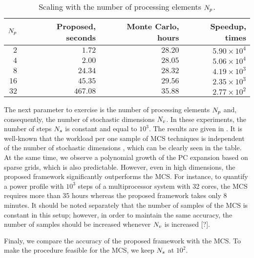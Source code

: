 \begin{table}
  \centering
  \caption{Scaling with the number of processing elements ${N_p}$.}
  \vspace{-10pt}
  \begin{tabular}{|r|r|r|r|}
    \hline
    ${N_p}$ & Proposed, seconds & Monte Carlo, hours & Speedup, times \\
    \hline
    $ 2$ & $  1.72$ & $28.20$ & $5.90 \times 10^4$ \\
    $ 4$ & $  2.00$ & $28.05$ & $5.06 \times 10^4$ \\
    $ 8$ & $ 24.34$ & $28.32$ & $4.19 \times 10^3$ \\
    $16$ & $ 45.35$ & $29.56$ & $2.35 \times 10^3$ \\
    $32$ & $467.08$ & $35.88$ & $2.77 \times 10^2$ \\
    \hline
  \end{tabular}
  \vspace{-10pt}
\end{table}
The next parameter to exercise is the number of processing elements ${N_p}$ and, consequently, the number of stochastic dimensions ${N_v}$. In these experiments, the number of steps ${N_s}$ is constant and equal to $10^3$. The results are given in . It is well-known that the workload per one sample of MCS techniques is independent of the number of stochastic dimensions \cite{maitre2010}, which can be clearly seen in the table. At the same time, we observe a polynomial growth \cite{heiss2008} of the PC expansion based on sparse grids, which is also predictable. However, even in high dimensions, the proposed framework significantly outperforms the MCS. For instance, to quantify a power profile with $10^3$ steps of a multiprocessor system with 32 cores, the MCS requires more than 35 hours whereas the proposed framework takes only 8 minutes. It should be noted separately that the number of samples of the MCS is constant in this setup; however, in order to maintain the same accuracy, the number of samples should be increased whenever ${N_v}$ is increased [?].

Finaly, we compare the accuracy of the proposed framework with the MCS. To make the procedure feasible for the MCS, we keep ${N_s}$ at $10^2$.
